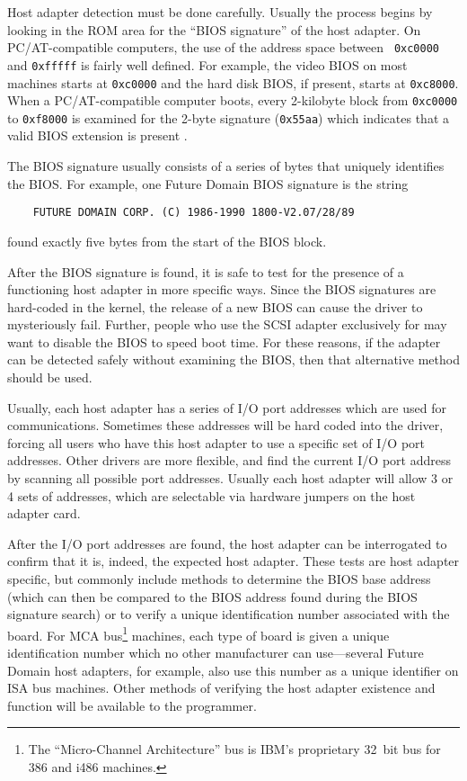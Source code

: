 Host adapter detection must be done carefully.  Usually the process begins
by looking in the ROM area for the ``BIOS signature'' of the host adapter.
On PC/AT-compatible computers, the use of the address space between {\tt
  0xc0000} and {\tt 0xfffff} is fairly well defined.  For example, the
video BIOS on most machines starts at {\tt 0xc0000} and the hard disk BIOS,
if present, starts at {\tt 0xc8000}.  When a PC/AT-compatible computer
boots, every 2-kilobyte block from {\tt 0xc0000} to {\tt 0xf8000} is
examined for the 2-byte signature ({\tt 0x55aa}) which indicates that a
valid BIOS extension is present \cite{norton.guide}.

The BIOS signature usually consists of a series of bytes that uniquely
identifies the BIOS\@.  For example, one Future Domain BIOS signature is
the string
\begin{singlespace}
  \begin{center}
    \begin{verbatim}
    FUTURE DOMAIN CORP. (C) 1986-1990 1800-V2.07/28/89
    \end{verbatim}
  \end{center}
\end{singlespace}
\noindent found exactly five bytes from the start of the BIOS block.

After the BIOS signature is found, it is safe to test for the presence of a
functioning host adapter in more specific ways.  Since the BIOS signatures
are hard-coded in the kernel, the release of a new BIOS can cause the
driver to mysteriously fail.  Further, people who use the SCSI adapter
exclusively for \Linux{} may want to disable the BIOS to speed boot time.
For these reasons, if the adapter can be detected safely without examining
the BIOS, then that alternative method should be used.

Usually, each host adapter has a series of I/O port addresses which are
used for communications.  Sometimes these addresses will be hard coded into
the driver, forcing all \Linux{} users who have this host adapter to use a
specific set of I/O port addresses.  Other drivers are more flexible, and
find the current I/O port address by scanning all possible port addresses.
Usually each host adapter will allow 3 or 4 sets of addresses, which are
selectable via hardware jumpers on the host adapter card.

After the I/O port addresses are found, the host adapter can be
interrogated to confirm that it is, indeed, the expected host adapter.
These tests are host adapter specific, but commonly include methods to
determine the BIOS base address (which can then be compared to the BIOS
address found during the BIOS signature search) or to verify a unique
identification number associated with the board.  For MCA bus\footnote{The
  ``Micro-Channel Architecture'' bus is IBM's proprietary 32~bit bus for
  386 and i486 machines.} machines, each type of board is given a unique
identification number which no other manufacturer can use---several Future
Domain host adapters, for example, also use this number as a unique
identifier on ISA bus machines.  Other methods of verifying the host
adapter existence and function will be available to the programmer.


